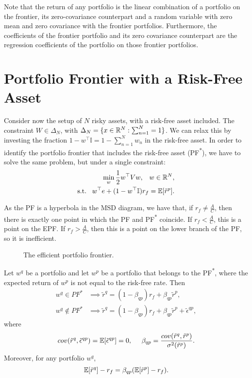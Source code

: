\documentclass[twoside, titlepage]{article}
\begin{document}
Note that the return of any portfolio is the linear combination of a portfolio on the frontier, its zero-covariance counterpart and a random variable with zero mean and zero covariance with the frontier portfolios. Furthermore, the coefficients of the frontier portfolio and its zero covariance counterpart are the regression coefficients of the portfolio on those frontier portfolios.


\section{Portfolio Frontier with a Risk-Free Asset}

Consider now the setup of $N$ risky assets, with a risk-free asset included. The constraint $W \in \Delta_N$, with $\Delta_N = \{x \in \mathbb{R}^N : \sum_{n=1}^{N} = 1\}$. We can relax this by investing the fraction $1 - w^\top \mathbb{I} = 1 - \sum_{n=1}^{N} w_n$ in the risk-free asset. In order to identify the portfolio frontier that includes the risk-free asset (PF\textsuperscript{*}), we have to solve the same problem, but under a single constraint:
\begin{align*}
    \min_w \frac{1}{2}w^\top V w, \;\;\; w \in \mathbb{R}^N, \\
    \text{s.t.} \;\;\; w^\top e + (1-w^\top \mathbb{I})r_f = \mathbb{E}[\tilde{r}^p].
\end{align*}

As the PF is a hyperbola in the MSD diagram, we have that, if $r_f \not= \frac{A}{C}$, then there is exactly one point in which the PF and PF\textsuperscript{*} coincide. If $r_f < \frac{A}{C}$, this is a point on the EPF. If $r_f > \frac{A}{C}$, then this is a point on the lower branch of the PF, so it is inefficient. 

\begin{figure}[ht]
    \centering
    \caption{The efficient portfolio frontier.}
    \label{fig:epf}
\end{figure}

\begin{proposition}
    Let $w^q$ be a portfolio and let $w^p$ be a portfolio that belongs to the PF\textsuperscript{*}, where the expected return of $w^p$ is not equal to the risk-free rate. Then
    \begin{align*}
        w^q \in PF^* &\implies \tilde{r}^q = (1-\beta_{qp})r_f + \beta_{qp}\tilde{r}^p, \\
        w^q \not\in PF^* &\implies \tilde{r}^q = (1-\beta_{qp})r_f + \beta_{qp}\tilde{r}^p + \tilde{\epsilon}^{qp},
    \end{align*}
    where
    \[
        cov(\tilde{r}^q, \tilde{\epsilon}^{qp}) = \mathbb{E}[\tilde{\epsilon}^{qp}] = 0, \;\;\;\;\; \beta_{qp} = \frac{cov(\tilde{r}^q, \tilde{r}^p)}{\sigma^2(\tilde{r}^p)}.
    \]
    Moreover, for any portfolio $w^q$,
    \[
        \mathbb{E}[\tilde{r}^q] - r_f = \beta_{qp}(\mathbb{E}[\tilde{r}^p] - r_f).
    \]
\end{proposition}
\end{document}
